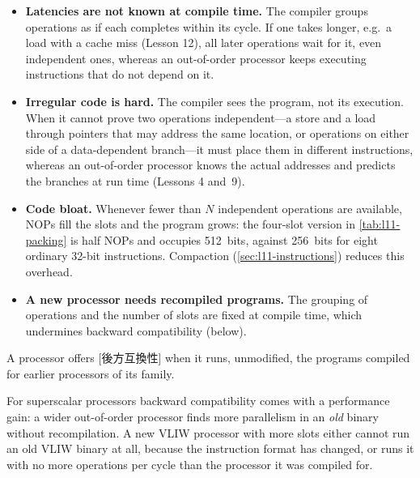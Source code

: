\documentclass[../main.tex]{subfiles}
\begin{document}
\begin{itemize}
  \item \textbf{Latencies are not known at compile time.}  The compiler
    groups operations as if each completes within its cycle.  If one takes
    longer, e.g.\ a load with a cache miss (Lesson 12), all later operations
    wait for it, even independent ones, whereas an out-of-order processor
    keeps executing instructions that do not depend on it.
  \item \textbf{Irregular code is hard.}  The compiler sees the program, not
    its execution.  When it cannot prove two operations independent---a store
    and a load through pointers that may address the same location, or
    operations on either side of a data-dependent branch---it must place them
    in different instructions, whereas an out-of-order processor knows the
    actual addresses and predicts the branches at run time (Lessons 4 and~9).
  \item \textbf{Code bloat.}  Whenever fewer than $N$ independent operations
    are available, NOPs fill the slots and the program grows: the four-slot
    version in \cref{tab:l11-packing} is half NOPs and occupies 512~bits,
    against 256~bits for eight ordinary 32-bit instructions.  Compaction
    (\cref{sec:l11-instructions}) reduces this overhead.
  \item \textbf{A new processor needs recompiled programs.}  The grouping of
    operations and the number of slots are fixed at compile time, which
    undermines backward compatibility (below).
\end{itemize}

\begin{definition}
  A processor offers [後方互換性] when it runs,
  unmodified, the programs compiled for earlier processors of its family.
\end{definition}

For superscalar processors backward compatibility comes with a performance
gain: a wider out-of-order processor finds more parallelism in an \emph{old}
binary without recompilation.  A new VLIW processor with more slots either
cannot run an old VLIW binary at all, because the instruction format has
changed, or runs it with no more operations per cycle than the processor it
was compiled for.
\end{document}
